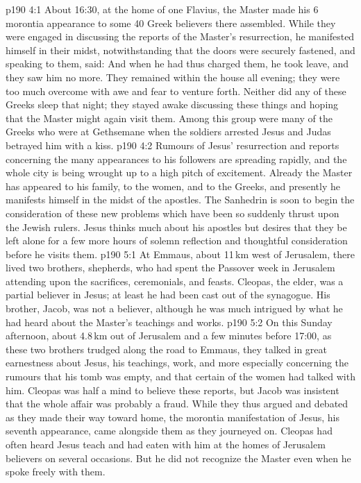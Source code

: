 \vs p190 4:1 About 16:30, at the home of one Flavius, the Master made his 6 morontia appearance to some 40 Greek believers there assembled. While they were engaged in discussing the reports of the Master’s resurrection, he manifested himself in their midst, notwithstanding that the doors were securely fastened, and speaking to them, said:  And when he had thus charged them, he took leave, and they saw him no more. They remained within the house all evening; they were too much overcome with awe and fear to venture forth. Neither did any of these Greeks sleep that night; they stayed awake discussing these things and hoping that the Master might again visit them. Among this group were many of the Greeks who were at Gethsemane when the soldiers arrested Jesus and Judas betrayed him with a kiss.
\vs p190 4:2 \pc Rumours of Jesus’ resurrection and reports concerning the many appearances to his followers are spreading rapidly, and the whole city is being wrought up to a high pitch of excitement. Already the Master has appeared to his family, to the women, and to the Greeks, and presently he manifests himself in the midst of the apostles. The Sanhedrin is soon to begin the consideration of these new problems which have been so suddenly thrust upon the Jewish rulers. Jesus thinks much about his apostles but desires that they be left alone for a few more hours of solemn reflection and thoughtful consideration before he visits them.
\vs p190 5:1 At Emmaus, about 11\,km west of Jerusalem, there lived two brothers, shepherds, who had spent the Passover week in Jerusalem attending upon the sacrifices, ceremonials, and feasts. Cleopas, the elder, was a partial believer in Jesus; at least he had been cast out of the synagogue. His brother, Jacob, was not a believer, although he was much intrigued by what he had heard about the Master’s teachings and works.
\vs p190 5:2 On this Sunday afternoon, about 4.8\,km out of Jerusalem and a few minutes before 17:00, as these two brothers trudged along the road to Emmaus, they talked in great earnestness about Jesus, his teachings, work, and more especially concerning the rumours that his tomb was empty, and that certain of the women had talked with him. Cleopas was half a mind to believe these reports, but Jacob was insistent that the whole affair was probably a fraud. While they thus argued and debated as they made their way toward home, the morontia manifestation of Jesus, his seventh appearance, came alongside them as they journeyed on. Cleopas had often heard Jesus teach and had eaten with him at the homes of Jerusalem believers on several occasions. But he did not recognize the Master even when he spoke freely with them.
